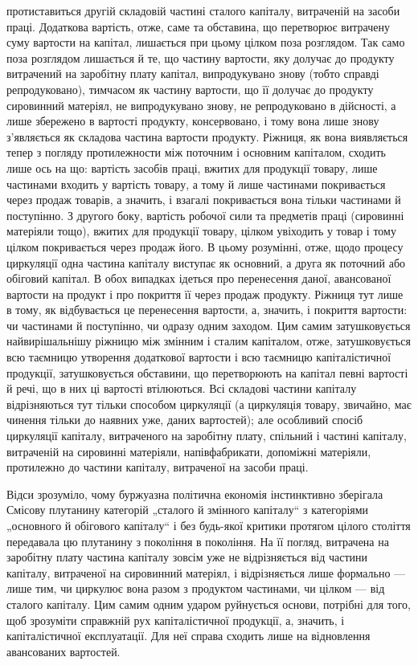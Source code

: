 \parcont{}  %
протиставиться другій складовій частині сталого капіталу, витраченій на
засоби праці. Додаткова вартість, отже, саме та обставина, що перетворює
витрачену суму вартости на капітал, лишається при цьому цілком
поза розглядом. Так само поза розглядом лишається й те, що частину
вартости, яку долучає до продукту витрачений на заробітну плату капітал,
випродукувано знову (тобто справді репродуковано), тимчасом як
частину вартости, що її долучає до продукту сировинний матеріял, не
випродукувано знову, не репродуковано в дійсності, а лише збережено
в вартості продукту, консервовано, і тому вона лише знову з’являється як
складова частина вартости продукту. Ріжниця, як вона виявляється тепер
з погляду протилежности між поточним і основним капіталом, сходить
лише ось на що: вартість засобів праці, вжитих для продукції товару,
лише частинами входить у вартість товару, а тому й лише частинами
покривається через продаж товарів, а значить, і взагалі покривається вона
тільки частинами й поступінно. З другого боку, вартість робочої
сили та предметів праці (сировинні матеріяли тощо), вжитих для
продукції товару, цілком увіходить у товар і тому цілком покривається
через продаж його. В цьому розумінні, отже, щодо процесу
циркуляції одна частина капіталу виступає як основний, а друга як поточний
або обіговий капітал. В обох випадках ідеться про перенесення
даної, авансованої вартости на продукт і про покриття її через продаж
продукту. Ріжниця тут лише в тому, як відбувається це перенесення вартости,
а, значить, і покриття вартости: чи частинами й поступінно, чи
одразу одним заходом. Цим самим затушковується найвирішальнішу ріжницю
між змінним і сталим капіталом, отже, затушковується всю таємницю
утворення додаткової вартости і всю таємницю капіталістичної продукції,
затушковується обставини, що перетворюють на капітал певні вартості
й речі, що в них ці вартості втілюються. Всі складові частини капіталу
відрізняються тут тільки способом циркуляції (а циркуляція товару,
звичайно, має чинення тільки до наявних уже, даних вартостей); але особливий
спосіб циркуляції капіталу, витраченого на заробітну плату, спільний і
частині капіталу, витраченій на сировинні матеріяли, напівфабрикати,
допоміжні матеріяли, протилежно до частини капіталу, витраченої на засоби
праці.

Відси зрозуміло, чому буржуазна політична економія інстинктивно
зберігала Смісову плутанину категорій „сталого й змінного капіталу“
з категоріями „основного й обігового капіталу“ і без будь-якої критики
протягом цілого століття передавала цю плутанину з покоління в покоління.
На її погляд, витрачена на заробітну плату частина капіталу зовсім
уже не відрізняється від частини капіталу, витраченої на сировинний
матеріял, і відрізняється лише формально — лише тим, чи циркулює вона
разом з продуктом частинами, чи цілком — від сталого капіталу. Цим
самим одним ударом руйнується основи, потрібні для того, щоб зрозуміти
справжній рух капіталістичної продукції, а, значить, і капіталістичної
експлуатації. Для неї справа сходить лише на відновлення авансованих
вартостей.
